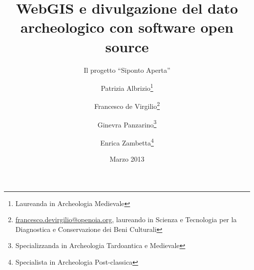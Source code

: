 \documentclass{paper}
\begin{document}

\renewcommand{\nameyeardelim}{, } %

\renewcommand{\bibleftparen}{}
\renewcommand{\bibrightparen}{}

\renewcommand*{\newunitpunct}{\addcomma\space}



\renewcommand*{\mkbibnamelast}[1]{%
    \ifmknamesc{\textsc{#1}}
}


\title{WebGIS e divulgazione del dato archeologico con software open source}

\subtitle{Il progetto ``Siponto Aperta''}

\author{
    \large{Patrizia Albrizio\thanks{Laureanda in Archeologia Medievale}}
    \and
    \large{Francesco de Virgilio\thanks{\protect\href{mailto:francesco.devirgilio@openoia.org}{francesco.devirgilio@openoia.org}, laureando in Scienza e Tecnologia per la Diagnostica e Conservazione dei Beni Culturali}}
    \and
    \large{Ginevra Panzarino\thanks{Specializzanda in Archeologia Tardoantica e Medievale}}
    \and
    \large{Enrica Zambetta\thanks{Specialista in Archeologia Post-classica}}
}


\date{Marzo 2013}
\maketitle
\enlargethispage{5cm}
\end{document}
